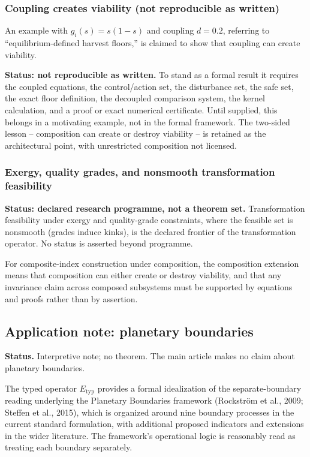 \documentclass[preprint,11pt,authoryear]{elsarticle}
\theoremstyle{remark}
\begin{document}
\subsubsection{Coupling creates viability (not reproducible as written)}

An example with $g_i(s) = s(1-s)$ and coupling $d = 0.2$, referring to ``equilibrium-defined harvest floors,'' is claimed to show that coupling can create viability.

\textbf{Status: not reproducible as written.} To stand as a formal result it requires the coupled equations, the control/action set, the disturbance set, the safe set, the exact floor definition, the decoupled comparison system, the kernel calculation, and a proof or exact numerical certificate. Until supplied, this belongs in a motivating example, not in the formal framework. The two-sided lesson -- composition can create or destroy viability -- is retained as the architectural point, with unrestricted composition not licensed.

\subsubsection{Exergy, quality grades, and nonsmooth transformation feasibility}

\textbf{Status: declared research programme, not a theorem set.} Transformation feasibility under exergy and quality-grade constraints, where the feasible set is nonsmooth (grades induce kinks), is the declared frontier of the transformation operator. No status is asserted beyond programme.

For composite-index construction under composition, the composition extension means that composition can either create or destroy viability, and that any invariance claim across composed subsystems must be supported by equations and proofs rather than by assertion.

\subsection{Application note: planetary boundaries}

\noindent\textbf{Status.} Interpretive note; no theorem. The main article makes no claim about planetary boundaries.

The typed operator $E_{\mathrm{typ}}$ provides a formal idealization of the separate-boundary reading underlying the Planetary Boundaries framework (Rockstr\"om et al., 2009; Steffen et al., 2015), which is organized around nine boundary processes in the current standard formulation, with additional proposed indicators and extensions in the wider literature. The framework's operational logic is reasonably read as treating each boundary separately.
\end{document}
